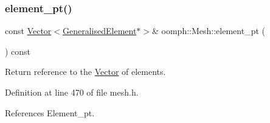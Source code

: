 \subsubsection{\texorpdfstring{element\+\_\+pt()}{element\_pt()}\hspace{0.1cm}{\footnotesize\ttfamily [3/4]}}
{\footnotesize\ttfamily const \hyperlink{classoomph_1_1Vector}{Vector}$<$\hyperlink{classoomph_1_1GeneralisedElement}{Generalised\+Element}$\ast$$>$\& oomph\+::\+Mesh\+::element\+\_\+pt (\begin{DoxyParamCaption}{ }\end{DoxyParamCaption}) const\hspace{0.3cm}{\ttfamily [inline]}}



Return reference to the \hyperlink{classoomph_1_1Vector}{Vector} of elements. 



Definition at line 470 of file mesh.\+h.



References Element\+\_\+pt.



